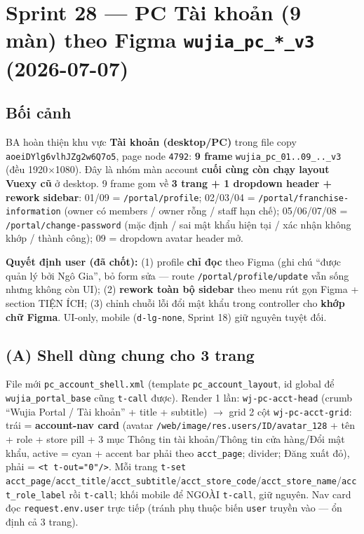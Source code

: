 \chapter{Sprint 28 --- PC Tài khoản (9 màn) theo Figma \texttt{wujia\_pc\_*\_v3} (2026-07-07)}

\section{Bối cảnh}

BA hoàn thiện khu vực \textbf{Tài khoản (desktop/PC)} trong file copy \texttt{aoeiDYlg6vlhJZg2w6Q7o5}, page node \texttt{4792}: \textbf{9 frame} \texttt{wujia\_pc\_01..09\_..\_v3} (đều 1920$\times$1080). Đây là nhóm màn account \textbf{cuối cùng còn chạy layout Vuexy cũ} ở desktop. 9 frame gom về \textbf{3 trang + 1 dropdown header + rework sidebar}: 01/09 = \texttt{/portal/profile}; 02/03/04 = \texttt{/portal/franchise-information} (owner có members / owner rỗng / staff hạn chế); 05/06/07/08 = \texttt{/portal/change-password} (mặc định / sai mật khẩu hiện tại / xác nhận không khớp / thành công); 09 = dropdown avatar header mở.

\textbf{Quyết định user (đã chốt):} (1) profile \textbf{chỉ đọc} theo Figma (ghi chú ``được quản lý bởi Ngô Gia'', bỏ form sửa --- route \texttt{/portal/profile/update} vẫn sống nhưng không còn UI); (2) \textbf{rework toàn bộ sidebar} theo menu rút gọn Figma + section TIỆN ÍCH; (3) chỉnh chuỗi lỗi đổi mật khẩu trong controller cho \textbf{khớp chữ Figma}. UI-only, mobile (\texttt{d-lg-none}, Sprint 18) giữ nguyên tuyệt đối.

\section{(A) Shell dùng chung cho 3 trang}

File mới \texttt{pc\_account\_shell.xml} (template \texttt{pc\_account\_layout}, id global để \texttt{wujia\_portal\_base} cũng \texttt{t-call} được). Render 1 lần: \texttt{wj-pc-acct-head} (crumb ``Wujia Portal / Tài khoản'' + title + subtitle) $\rightarrow$ grid 2 cột \texttt{wj-pc-acct-grid}: trái = \textbf{account-nav card} (avatar \texttt{/web/image/res.users/ID/avatar\_128} + tên + role + store pill + 3 mục Thông tin tài khoản/Thông tin cửa hàng/Đổi mật khẩu, active = cyan + accent bar phải theo \texttt{acct\_page}; divider; Đăng xuất đỏ), phải = \texttt{<t t-out="0"/>}. Mỗi trang \texttt{t-set} \texttt{acct\_page}/\texttt{acct\_title}/\texttt{acct\_subtitle}/\texttt{acct\_store\_code}/\texttt{acct\_store\_name}/\texttt{acct\_role\_label} rồi \texttt{t-call}; khối mobile để NGOÀI \texttt{t-call}, giữ nguyên. Nav card đọc \texttt{request.env.user} trực tiếp (tránh phụ thuộc biến \texttt{user} truyền vào --- ổn định cả 3 trang).

